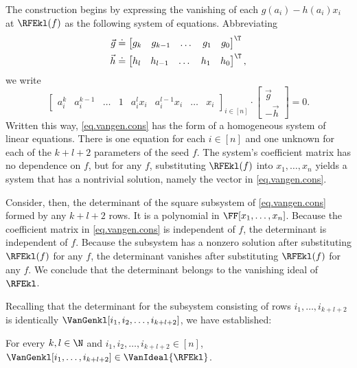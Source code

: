 The construction begins by expressing the vanishing of each
\(g(a_i) - h(a_i)x_i\) at \(\RFEkl(f)\)
as the following system of equations.
Abbreviating
\begin{align*}
  \vec{g} &\doteq
  \begin{bmatrix}
    g_k & g_{k-1} & \dots & g_1 & g_0
  \end{bmatrix}^\T
  \\
  \vec{h} &\doteq
  \begin{bmatrix}
    h_l & h_{l-1} & \dots & h_1 & h_0
  \end{bmatrix}^\T,
\end{align*}
we write
\begin{equation}\label{eq.vangen.cons}
  \begin{bmatrix}
    a_i^k     & a_i^{k-1}    & \dots & 1 &
    a_i^l x_i & a_i^{l-1}x_i & \dots & x_i
  \end{bmatrix}_{i \in [n]}
  \cdot
  \begin{bmatrix}
    \vec{g} \\
    -\vec{h}
  \end{bmatrix}
  = 0.
\end{equation}
Written this way, \eqref{eq.vangen.cons} has the form of a homogeneous system
of linear equations.
There is one equation for each \(i \in [n]\)
and one unknown for each of the \(k+l+2\) parameters of the seed \(f\).
The system's coefficient matrix has no dependence on \(f\), but 
for any \(f\), substituting \(\RFEkl(f)\) into \(x_1, \ldots, x_n\)
yields a system that has a nontrivial solution,
namely the vector in \eqref{eq.vangen.cons}.

Consider, then,
the determinant of the square subsystem of \eqref{eq.vangen.cons} formed by
any \(k+l+2\) rows.
It is a polynomial in \(\FF[x_1, \ldots, x_n]\).
Because the coefficient matrix in \eqref{eq.vangen.cons} is independent of
\(f\),
the determinant is independent of \(f\).
Because the subsystem has a nonzero solution after substituting \(\RFEkl(f)\)
for any \(f\),
the determinant vanishes after substituting \(\RFEkl(f)\) for any \(f\).
We conclude that the determinant belongs to the vanishing ideal of \(\RFEkl\).

Recalling that the determinant for the subsystem consisting of rows
\(i_1,\ldots,i_{k+l+2}\) is identically
$\VanGenkl[i_1,i_2, \dots, i_{k+l+2}]$,
we have established:
\begin{lemma}
  \label{lemma.vangen-vanishes}
  For every \(k,l \in \N\) and $i_1,i_2,\dots,i_{k+l+2} \in [n]$,
  \(\VanGenkl[i_1, \ldots, i_{k+l+2}] \in \VanIdeal{\RFEkl}\).
\end{lemma}

